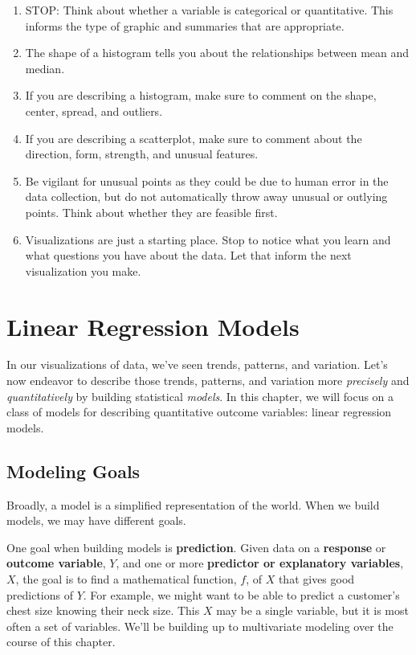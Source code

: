 \documentclass[
]{book}
\begin{document}
\begin{enumerate}
\def\labelenumi{\arabic{enumi}.}
\item
  STOP: Think about whether a variable is categorical or quantitative. This informs the type of graphic and summaries that are appropriate.
\item
  The shape of a histogram tells you about the relationships between mean and median.
\item
  If you are describing a histogram, make sure to comment on the shape, center, spread, and outliers.
\item
  If you are describing a scatterplot, make sure to comment about the direction, form, strength, and unusual features.
\item
  Be vigilant for unusual points as they could be due to human error in the data collection, but do not automatically throw away unusual or outlying points. Think about whether they are feasible first.
\item
  Visualizations are just a starting place. Stop to notice what you learn and what questions you have about the data. Let that inform the next visualization you make.
\end{enumerate}

\chapter{Linear Regression Models}\label{linear-regression-models}

In our visualizations of data, we've seen trends, patterns, and variation. Let's now endeavor to describe those trends, patterns, and variation more \emph{precisely} and \emph{quantitatively} by building statistical \emph{models}. In this chapter, we will focus on a class of models for describing quantitative outcome variables: linear regression models.

\section{Modeling Goals}\label{modeling-goals}

Broadly, a model is a simplified representation of the world. When we build models, we may have different goals.

One goal when building models is \textbf{prediction}. Given data on a \textbf{response} or \textbf{outcome variable}, \(Y\), and one or more \textbf{predictor or explanatory variables}, \(X\), the goal is to find a mathematical function, \(f\), of \(X\) that gives good predictions of \(Y\). For example, we might want to be able to predict a customer's chest size knowing their neck size. This \(X\) may be a single variable, but it is most often a set of variables. We'll be building up to multivariate modeling over the course of this chapter.
\end{document}
